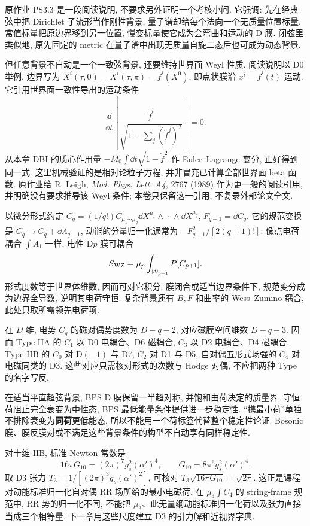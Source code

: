 原作业 PS3.3 是一段阅读说明, 不要求另外证明一个考核小问. 它强调: 先在经典弦中把 Dirichlet 子流形当作刚性背景, 量子谱却给每个法向一个无质量位置标量, 常值标量把原边界移到另一位置, 慢变标量使它成为会弯曲和运动的 D 膜. 闭弦里类似地, 原先固定的 metric 在量子谱中出现无质量自旋二态后也可成为动态背景.

但任意背景不自动是一个一致弦背景, 还要维持世界面 Weyl 性质. 阅读说明以 D0 举例, 边界写为 $X^i(\tau,0)=X^i(\tau,\pi)=f^i(X^0)$, 即点状膜沿 $x^i=f^i(t)$ 运动. 它引用世界面一致性导出的运动条件
\[
\frac\dd{\dd t}\left[\frac{\dot f^i}{\sqrt{1-\sum_j(\dot f^j)^2}}\right]=0.
\]
从本章 DBI 的质心作用量 $-M_0\int\dd t\sqrt{1-\dot f^2}$ 作 Euler--Lagrange 变分, 正好得到同一式. 这里机械验证的是相对论粒子方程, 并非冒充已计算全部世界面 beta 函数. 原作业给 R. Leigh, \textit{Mod. Phys. Lett. A4}, 2767 (1989) 作为更一般的阅读引用, 并明确没有要求推导该 Weyl 条件; 本卷只保留这一引用, 不复录外部论文全文.

以微分形式约定
$C_q=(1/q!)C_{\mu_1\cdots\mu_q}\dd X^{\mu_1}\wedge\cdots\wedge\dd X^{\mu_q}$,
$F_{q+1}=\dd C_q$. 它的规范变换是 $C_q\to C_q+\dd\Lambda_{q-1}$, 动能的分量归一化通常为 $-F_{q+1}^2/[2(q+1)!]$. 像点电荷耦合 $\int A_1$ 一样, 电性 D$p$ 膜可耦合
\[
S_{\rm WZ}=\mu_p\int_{\mathcal W_{p+1}}P[C_{p+1}].
\]
形式度数等于世界体维数, 因而可对它积分. 膜闭合或适当边界条件下, 规范变分成为边界全导数, 说明其电荷守恒. 复杂背景还有 $B,F$ 和曲率的 Wess--Zumino 耦合, 此处只取所需领先电荷项.

在 $D$ 维, 电势 $C_q$ 的磁对偶势度数为 $D-q-2$, 对应磁膜空间维数 $D-q-3$. 因而 Type IIA 的 $C_1$ 以 D0 电耦合、D6 磁耦合, $C_3$ 以 D2 电耦合、D4 磁耦合. Type IIB 的 $C_0$ 对 D$(-1)$ 与 D7, $C_2$ 对 D1 与 D5, 自对偶五形式场强的 $C_4$ 对电磁同类的 D3. 这些对应只需核对形式的次数与 Hodge 对偶, 不应把两种 Type 的名字写反.

在适当平直超弦背景, BPS D 膜保留一半超对称, 并饱和由荷决定的质量界. 守恒荷阻止完全衰变为中性态, BPS 最低能量条件提供进一步稳定性. “携最小荷”单独不排除衰变为\textbf{同荷}更低能态, 所以不能用一个荷标签代替整个稳定性论证. Bosonic 膜、膜反膜对或不满足这些背景条件的构型不自动享有同样稳定性.

对十维 IIB, 标准 Newton 常数是
\[
16\pi G_{10}=(2\pi)^7g_s^2(\alpha')^4,
\qquad G_{10}=8\pi^6g_s^2(\alpha')^4.
\]
取 D3 张力 $T_3=1/[(2\pi)^3g_s(\alpha')^2]$, 可核对 $T_3\sqrt{16\pi G_{10}}=\sqrt{2\pi}$. 这正是课程对动能标准归一化自对偶 RR 场所给的最小电磁荷. 在 $\mu_3\int C_4$ 的 string-frame 规范中, RR 势的归一化不同, 不能把 $\mu_3$、此无量纲动能标准归一化荷以及张力直接当成三个相等量. 下一章用这些尺度建立 D3 的引力解和近视界字典.
